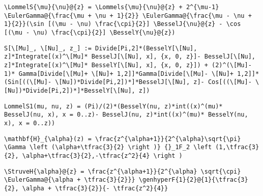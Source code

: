 \newsavebox\CBST
\begin{lrbox}{\CBST}
 \begin{minipage}[t]{0.82\textwidth}
  \lstinline[language={[latex]TeX},mathescape,breaklines=true]"\LommelS{\mu}{\nu}@{z} = \Lommels{\mu}{\nu}@{z} + 2^{\mu-1} \EulerGamma@{\frac{\mu + \nu + 1}{2}} \EulerGamma@{\frac{\mu - \nu + 1}{2}}(\sin [(\mu - \nu) \frac{\cpi}{2}] \BesselJ{\nu}@{z} - \cos [(\mu - \nu) \frac{\cpi}{2}] \BesselY{\nu}@{z})"
 \end{minipage}
\end{lrbox}
\newsavebox\CBMM
\begin{lrbox}{\CBMM}
 \begin{minipage}[t]{0.82\textwidth}
  \lstinline[language={[latex]TeX},mathescape,breaklines=true]"S[\[Mu]_, \[Nu]_, z_] := Divide[Pi,2]*(BesselY[\[Nu], z]*Integrate[(x)^\[Mu]* BesselJ[\[Nu], x], {x, 0, z}]- BesselJ[\[Nu], z]*Integrate[(x)^\[Mu]* BesselY[\[Nu], x], {x, 0, z}]) + (2)^(\[Mu]- 1)* Gamma[Divide[\[Mu]+ \[Nu]+ 1,2]]*Gamma[Divide[\[Mu]- \[Nu]+ 1,2]]*(Sin[((\[Mu]- \[Nu])*Divide[Pi,2])*]*BesselJ[\[Nu], z]- Cos[((\[Mu]- \[Nu])*Divide[Pi,2])*]*BesselY[\[Nu], z])"
 \end{minipage}
\end{lrbox}
\newsavebox\CBMA
\begin{lrbox}{\CBMA}
 \begin{minipage}[t]{0.82\textwidth}
  \lstinline[language={[latex]TeX},mathescape,breaklines=true]"LommelS1(mu, nu, z) = (Pi)/(2)*(BesselY(nu, z)*int((x)^(mu)* BesselJ(nu, x), x = 0..z)- BesselJ(nu, z)*int((x)^(mu)* BesselY(nu, x), x = 0..z))"
 \end{minipage}
\end{lrbox}
\newsavebox\CCT
\begin{lrbox}{\CCT}
 \begin{minipage}[t]{0.82\textwidth}
  \lstinline[language={[latex]TeX},mathescape,breaklines=true]"\mathbf{H}_{\alpha}(z) = \frac{z^{\alpha+1}}{2^{\alpha}\sqrt{\pi} \Gamma \left (\alpha+\tfrac{3}{2} \right )} {}_1F_2 \left (1,\tfrac{3}{2}, \alpha+\tfrac{3}{2},-\tfrac{z^2}{4} \right )"
 \end{minipage}
\end{lrbox}
\newsavebox\CCST
\begin{lrbox}{\CCST}
 \begin{minipage}[t]{0.82\textwidth}
  \lstinline[language={[latex]TeX},mathescape,breaklines=true]"\StruveH{\alpha}@{z} = \frac{z^{\alpha+1}}{2^{\alpha} \sqrt{\cpi} \EulerGamma@{\alpha + \tfrac{3}{2}}} \genhyperF{1}{2}@{1}{\tfrac{3}{2}, \alpha + \tfrac{3}{2}}{- \tfrac{z^2}{4}}"
 \end{minipage}
\end{lrbox}
